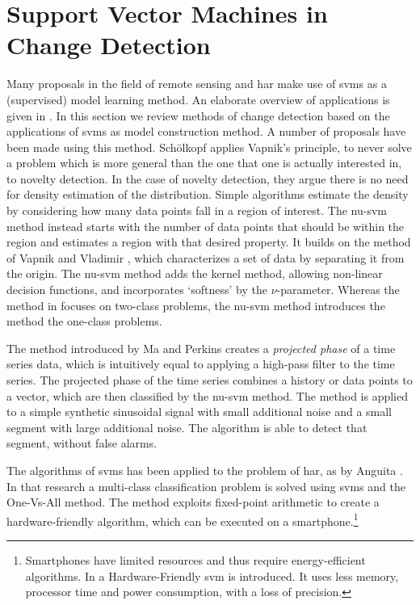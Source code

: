 \section{Support Vector Machines in Change Detection}\label{sec:svm_in_change_detection}

Many proposals in the field of remote sensing and \gls{har} make use of \glspl{svm} as a (supervised) model learning method.
An elaborate overview of applications is given in \cite{mountrakis2011support}.
In this section we review methods of change detection based on the applications of \glspl{svm} as model construction method.
A number of proposals have been made using this method.
Sch{\"o}lkopf \etal \cite{scholkopf1999support} applies Vapnik's principle, to never solve a problem which is more general than the one that one is actually interested in, to novelty detection.
In the case of novelty detection, they argue there is no need for density estimation of the distribution.
Simple algorithms estimate the density by considering how many data points fall in a region of interest.
The \gls{nu-svm} method instead starts with the number of data points that should be within the region and estimates a region with that desired property.
It builds on the method of Vapnik and Vladimir \cite{vapnik1963pattern}, which characterizes a set of data by separating it from the origin.
The \gls{nu-svm} method adds the kernel method, allowing non-linear decision functions, and incorporates `softness' by the $\nu$-parameter.
Whereas the method in \cite{vapnik1963pattern} focuses on two-class problems, the \gls{nu-svm} method introduces the method the one-class problems.

The method introduced by Ma and Perkins \cite{ma2003time} creates a \emph{projected phase} of a time series data, which is intuitively equal to applying a high-pass filter to the time series.
The projected phase of the time series combines a history or data points to a vector, which are then classified by the \gls{nu-svm} method.
The method is applied to a simple synthetic sinusoidal signal with small additional noise and a small segment with large additional noise.
The algorithm is able to detect that segment, without false alarms.

The algorithms of \glspl{svm} has been applied to the problem of \gls{har}, as by Anguita \etal \cite{anguitahuman}.
In that research a multi-class classification problem is solved using \glspl{svm} and the One-Vs-All method.
The method exploits fixed-point arithmetic to create a hardware-friendly algorithm, which can be executed on a smartphone.\footnote{Smartphones have limited resources and thus require energy-efficient algorithms. In \cite{anguita2007hardware} a Hardware-Friendly \gls{svm} is introduced. It uses less memory, processor time and power consumption, with a loss of precision.}

